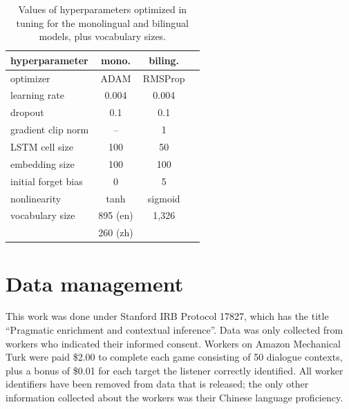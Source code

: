 \documentclass[11pt,a4paper]{article}
\renewcommand{\|}{\mid}
\begin{document}
\begin{table}[!h]
\centering
\begin{tabular}{lccc}
\toprule
hyperparameter      & mono. & biling. \\
\midrule
optimizer           & ADAM  & RMSProp \\
learning rate       & 0.004 & 0.004 \\
dropout             & 0.1   & 0.1 \\
gradient clip norm  & --    & 1 \\
LSTM cell size      & 100   & 50 \\
embedding size      & 100   & 100 \\
initial forget bias & 0     & 5 \\
nonlinearity        & tanh  & sigmoid \\
\midrule
vocabulary size     & 895 (en) & 1,326 \\
                    & 260 (zh) & \\
\bottomrule
\end{tabular}
\caption{Values of hyperparameters optimized in tuning for the monolingual and bilingual models, plus vocabulary sizes.}
\label{tab:hyperparameters}
\end{table}

\section{Data management} \label{sec:irb}

This work was done under
Stanford IRB Protocol 17827, which has the title ``Pragmatic enrichment and contextual inference''.
Data was only collected from workers who indicated their informed consent.
Workers on Amazon Mechanical Turk were paid \$2.00 to complete each game consisting of 50 dialogue contexts, plus
a bonus of \$0.01 for each target the listener correctly identified.
All worker identifiers have been removed from data that is released; the only other information collected
about the workers was their Chinese language proficiency.
\end{document}
